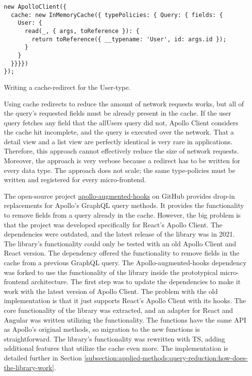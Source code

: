 \ifshowListings
\begin{listing}[H]
\begin{verbatim}
new ApolloClient({
  cache: new InMemoryCache({ typePolicies: { Query: { fields: {
    User: {
      read(_, { args, toReference }): {
        return toReference({ __typename: 'User', id: args.id });
      }
    }
  }}}})
});
\end{verbatim}
\caption{Writing a cache-redirect for the User-type.}\label{code:applied-methods:query-reduction:user-cache-redirect}
\end{listing}
\fi

\noindent Using cache redirects to reduce the amount of network requests works, but all of the query's requested fields must be already present in the cache. If the user query fetches any field that the allUsers query did not, Apollo Client considers the cache hit incomplete, and the query is executed over the network. That a detail view and a list view are perfectly identical is very rare in applications. Therefore, this approach cannot effectively reduce the size of network requests. Moreover, the approach is very verbose because a redirect has to be written for every data type. The approach does not scale; the same type-policies must be written and registered for every micro-frontend.

\bigskip

\noindent The open-source project \href{https://github.com/appmotion/apollo-augmented-hooks}{apollo-augmented-hooks} on GitHub provides drop-in replacements for Apollo's GraphQL query methods. It provides the functionality to remove fields from a query already in the cache. However, the big problem is that the project was developed specifically for React's Apollo Client. The dependencies were outdated, and the latest release of the library was in 2021. The library's functionality could only be tested with an old Apollo Client and React version. The dependency offered the functionality to remove fields in the cache from a previous GraphQL query. The Apollo-augmented-hooks dependency was forked to use the functionality of the library inside the prototypical micro-frontend architecture. The first step was to update the dependencies to make it work with the latest version of Apollo Client. The problem with the old implementation is that it just supports React's Apollo Client with its hooks. The core functionality of the library was extracted, and an adapter for React and Angular was written utilizing the functionality. The functions have the same \ac{API} as Apollo's original methods, so migration to the new functions is straightforward. The library's functionality was rewritten with \ac{TS}, adding additional features that utilize the cache even more. The implementation is detailed further in Section \ref{subsection:applied-methods:query-reduction:how-does-the-library-work}.

\ifshowAppliedMethodsTestingQueryReduction
  
\fi




